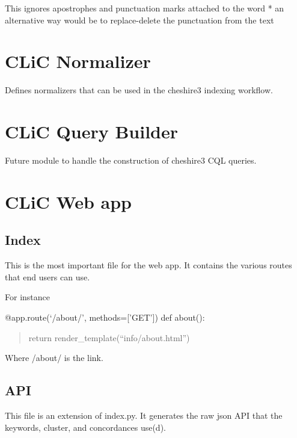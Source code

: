 \documentclass[letterpaper,10pt,english]{sphinxmanual}
\begin{document}

\begin{fulllineitems}
\label{apidoc:kwicgrouper.old_clean_punkt}
This ignores apostrophes and punctuation marks attached to the word
* an alternative way would be to replace-delete the punctuation from the text

\end{fulllineitems}



\section{CLiC Normalizer}
\label{apidoc:module-normalizer}\label{apidoc:clic-normalizer}
Defines normalizers that can be used in the cheshire3 indexing workflow.


\section{CLiC Query Builder}
\label{apidoc:module-querybuilder}\label{apidoc:clic-query-builder}
Future module to handle the construction of cheshire3 CQL queries.


\section{CLiC Web app}
\label{apidoc:clic-web-app}

\subsection{Index}
\label{apidoc:index}\label{apidoc:module-web.index}
This is the most important file for the web app. It contains the various
routes that end users can use.

For instance

@app.route(`/about/', methods={[}'GET'{]})
def about():
\begin{quote}

return render\_template(``info/about.html'')
\end{quote}

Where /about/ is the link.


\subsection{API}
\label{apidoc:api}\label{apidoc:module-web.api}
This file is an extension of index.py. It generates the raw json API that
the keywords, cluster, and concordances use(d).
\end{document}
